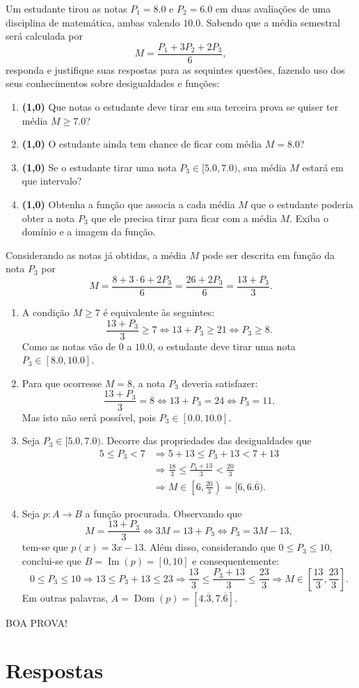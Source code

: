 \documentclass[12pt,a4paper]{article}
\newcommand*\dom[1]{\operatorname{Dom}\left(#1\right)}
\newcommand*\im[1]{\operatorname{Im}\left(#1\right)}
\begin{document}
\begin{ExerciseList}
\Exercise%
Um estudante tirou as notas $P_1 = 8.0$ e $P_2 = 6.0$ em duas avaliações de uma disciplina de matemática, ambas valendo $10.0$. Sabendo que a média semestral será calculada por
\[ M = \frac{P_1 + 3P_2 + 2P_3}{6}, \]
responda e justifique suas respostas para as sequintes questões, fazendo uso dos seus conhecimentos sobre desigualdades e funções:
\begin{enumerate}
\item \textbf{(1,0)} Que notas o estudante deve tirar em sua terceira prova se quiser ter média $M \geq 7.0$?
\item \textbf{(1,0)} O estudante ainda tem chance de ficar com média $M = 8.0$?
\item \textbf{(1,0)} Se o estudante tirar uma nota $P_3 \in [5.0, 7.0 )$, sua média $M$ estará em que intervalo?
\item \textbf{(1,0)} Obtenha a função que associa a cada média $M$ que o estudante poderia obter a nota $P_3$ que ele precisa tirar para ficar com a média $M$. Exiba o domínio e a imagem da função.
\end{enumerate}
\Answer Considerando as notas já obtidas, a média $M$ pode ser descrita em função da nota $P_3$ por
\[
M = \frac{8 + 3 \cdot 6 + 2P_3}{6}
  = \frac{26 + 2P_3}{6}
  = \frac{13 + P_3}{3}.
\]
\begin{enumerate}
\item A condição $M \geq 7$ é equivalente às seguintes:
\[
\frac{13 + P_3}{3} \geq 7
 \Leftrightarrow
13 + P_3 \geq 21
 \Leftrightarrow
P_3 \geq 8.
\]
Como as notas vão de $0$ a $10.0$, o estudante deve tirar uma nota $P_3 \in [8.0, 10.0]$.
\item Para que ocorresse $M = 8$, a nota $P_3$ deveria satisfazer:
\[
\frac{13 + P_3}{3} = 8
 \Leftrightarrow
13 + P_3 = 24
 \Leftrightarrow
P_3 = 11.
\]
Mas isto não será possível, pois $P_3 \in [0.0, 10.0]$.
\item Seja $P_3 \in [5.0, 7.0 )$. Decorre das propriedades das desigualdades que
\begin{align*}
5 \leq P_3 < 7
& \Rightarrow
5 + 13 \leq P_3 + 13 < 7 + 13 \\
& \Rightarrow
\frac{18}{3} \leq \frac{P_3 + 13}{3} < \frac{20}{3} \\
& \Rightarrow
M \in \left[ 6, \frac{20}{3} \right) = [6, 6.\overline{6}).
\end{align*}

\item Seja $p: A \to B$ a função procurada. Observando que
\[
M = \frac{13 + P_3}{3}
\Leftrightarrow
3M = 13 + P_3
\Leftrightarrow
P_3 = 3M - 13,
\]
tem-se que $p(x) = 3x - 13$. Além disso, considerando que $0 \leq P_3 \leq 10$, conclui-se que $B = \im{p} = [0, 10]$ e consequentemente:
\[
0 \leq P_3 \leq 10
\Rightarrow
13 \leq P_3 + 13 \leq 23
\Rightarrow
\frac{13}{3} \leq \frac{P_3 + 13}{3} \leq \frac{23}{3}
\Rightarrow
M \in \left[ \frac{13}{3}, \frac{23}{3} \right].
\]
Em outras palavras, $A = \dom{p} = [4.\overline{3}, 7.\overline{6}]$.
\end{enumerate}
\end{ExerciseList}

\begin{center}
BOA PROVA!
\end{center}

\newpage
\restoregeometry
\section*{Respostas}
\shipoutAnswer
\end{document}
